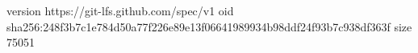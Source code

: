 version https://git-lfs.github.com/spec/v1
oid sha256:248f3b7c1e784d50a77f226e89e13f06641989934b98ddf24f93b7c938df363f
size 75051
